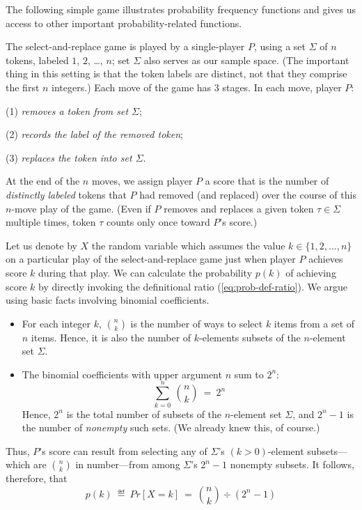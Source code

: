 The following simple game illustrates probability frequency functions and
gives us access to other important probability-related functions.

The {\sc select-and-replace} game is played by a single-player $P$, using a
set $\Sigma$ of $n$ tokens, labeled $1$, $2$, \ldots, $n$; set $\Sigma$
also serves as our sample space. (The important thing in this setting is that 
the token labels are distinct, not that they comprise the first $n$ integers.)
Each move of the game has $3$ stages.  In each move, player $P$:

(1) {\em removes a token from set $\Sigma$};

(2) {\em records the label of the removed token};

(3) {\em replaces the token into set $\Sigma$}.

\noindent
At the end of the $n$ moves, we assign player $P$ a score that is the number of 
{\em distinctly labeled} tokens that $P$ had removed (and replaced) over the
course of this $n$-move play of the game.  (Even if $P$ removes and replaces
a given token $\tau \in \Sigma$ multiple times, token $\tau$ counts only once toward $P$'s score.)

Let us denote by $X$ the random variable which assumes the value 
$k \in \{1, 2, \ldots, n\}$ on a particular play of the {\sc select-and-replace} game 
just when player $P$ achieves score $k$ during that play.  We can calculate the
probability $p(k)$ of achieving score $k$ by directly invoking the
definitional ratio (\ref{eq:prob-def-ratio}).  We argue using basic facts involving 
binomial coefficients.
\begin{itemize}
\item
For each integer $k$, $\displaystyle {n \choose k}$ is the number of ways to 
select $k$ items from a set of $n$ items.
Hence, it is also the number of $k$-elements subsets of the $n$-element 
set $\Sigma$.
\item
The binomial coefficients with upper argument $n$ sum to $2^n$:
\[ \sum_{k=0}^n \ {n \choose k} \ = \ 2^n \]
Hence, $2^n$ is the total number of subsets of the $n$-element set $\Sigma$,
and $2^n -1$ is the number of {\em nonempty} such sets.
(We already knew this, of course.)
\end{itemize}
Thus, $P$'s score can result from selecting any of $\Sigma$'s $(k > 0)$-element 
subsets---which are $\displaystyle {n \choose k}$ in number---from among 
$\Sigma$'s $2^n -1$ nonempty subsets.  It follows, therefore, that
\[ p(k) \ \eqdef \ Pr[X = k] \ = \ {n \choose k} \div (2^n -1)  \]

